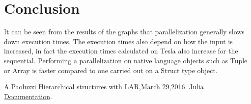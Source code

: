 \documentclass[a4paper,12pt]{article}
\begin{document}
\newpage

\section{Conclusion}
It can be seen from the results of the graphs that parallelization generally slows down execution times. 
The execution times also depend on how the input is increased, in fact the execution times calculated on Tesla also increase for the sequential. 
Performing a parallelization on native language objects such as Tuple or Array is faster compared to one carried out on a Struct type object.

\begin{thebibliography}{9}
 A.Paoluzzi
\href{https://github.com/cvdlab/lar-cc/blob/master/doc/pdf/larstruct.pdf}{Hierarchical structures with LAR},March 29,2016.
\href{https://docs.julialang.org/en/release-0.6/}{Julia Documentation}.
\end{thebibliography}
\end{document}
